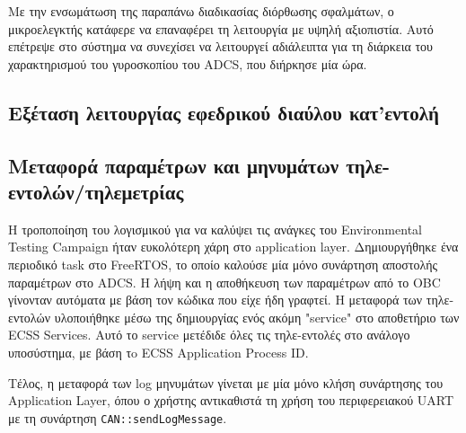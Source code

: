 \documentclass[a4paper,nobib,justified]{tufte-book}
\begin{document}
	Με την ενσωμάτωση της παραπάνω διαδικασίας διόρθωσης σφαλμάτων, ο μικροελεγκτής κατάφερε να επαναφέρει τη λειτουργία με υψηλή αξιοπιστία. Αυτό επέτρεψε στο σύστημα να συνεχίσει να λειτουργεί αδιάλειπτα για τη διάρκεια του χαρακτηρισμού του γυροσκοπίου του ADCS, που διήρκησε μία ώρα.

	\subsection{Εξέταση λειτουργίας εφεδρικού διαύλου κατ'εντολή}

	\subsection{Μεταφορά παραμέτρων και μηνυμάτων τηλε-εντολών/τηλεμετρίας}
	Η τροποποίηση του λογισμικού για να καλύψει τις ανάγκες του Environmental Testing Campaign ήταν ευκολότερη χάρη στο application layer. Δημιουργήθηκε ένα περιοδικό task στο FreeRTOS, το οποίο καλούσε μία μόνο συνάρτηση αποστολής παραμέτρων στο ADCS. Η λήψη και η αποθήκευση των παραμέτρων από το OBC γίνονταν αυτόματα με βάση τον κώδικα που είχε ήδη γραφτεί. Η μεταφορά των τηλε-εντολών υλοποιήθηκε μέσω της δημιουργίας ενός ακόμη "service" στο αποθετήριο των ECSS Services. Αυτό το service μετέδιδε όλες τις τηλε-εντολές στο ανάλογο υποσύστημα, με βάση τo ECSS Application Process ID.

	Τέλος, η μεταφορά των log μηνυμάτων γίνεται με μία μόνο κλήση συνάρτησης του Application Layer, όπου ο χρήστης αντικαθιστά τη χρήση του περιφερειακού UART με τη συνάρτηση \texttt{CAN::sendLogMessage}.
\end{document}
